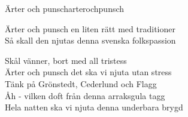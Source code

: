 \begin{song}{Ärter och punsch}{arterochpunsch}
\begin{vers}
Ärter och punsch en liten rätt med traditioner\\
Så skall den njutas denna svenska folkspassion\\
\end{vers}
\begin{vers}
Skål vänner, bort med all tristess\\
Ärter och punsch det ska vi njuta utan stress\\
Tänk på Grönstedt, Cederlund och Flagg\\
Åh - vilken doft från denna arraksgula tagg\\
Hela natten ska vi njuta denna underbara brygd\\
\end{vers}
\end{song}
